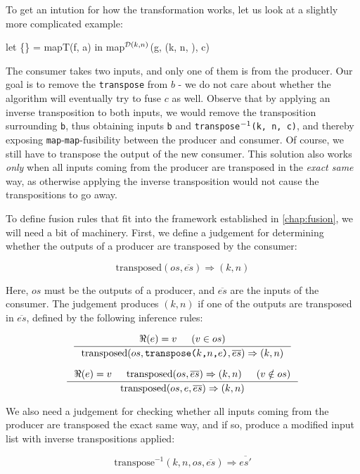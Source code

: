 To get an intution for how the transformation works, let us look at a
slightly more complicated example:

\begin{colorcode}
let \{\} = mapT(f, a) in
map\(^{\mathcal{D}(k,n)}\)(g, (k, n, ), c)
\end{colorcode}

The consumer takes two inputs, and only one of them is from the
producer.  Our goal is to remove the \texttt{transpose} from $b$ - we
do not care about whether the algorithm will eventually try to fuse
$c$ as well.  Observe that by applying an inverse transposition to
both inputs, we would remove the transposition surrounding \texttt{b},
thus obtaining inputs \texttt{b} and
\texttt{transpose\(^{-1}\)(k, n, c)}, and thereby exposing
\texttt{map}-\texttt{map}-fusibility between the producer and
consumer.  Of course, we still have to transpose the output of the new
consumer.  This solution also works \textit{only} when all inputs
coming from the producer are transposed in the \textit{exact same}
way, as otherwise applying the inverse transposition would not cause
the transpositions to go away.

To define fusion rules that fit into the framework established in
\cref{chap:fusion}, we will need a bit of machinery.  First, we define
a judgement for determining whether the outputs of a producer are
transposed by the consumer:

\[
\boxed{
  \text{transposed}(os,\overline{es}) \Rightarrow (k,n)
}
\]

Here, $os$ must be the outputs of a producer, and $\overline{es}$ are
the inputs of the consumer.  The judgement produces $(k,n)$ if one of
the outputs are transposed in $\overline{es}$, defined by the
following inference rules:

\[
\inference{
  \Re(e) = v
  &
  (v \in os)
}{
  \text{transposed}(os, \texttt{transpose($k$,$n$,$e$)}, \overline{es}) \Rightarrow (k,n)
}
\]

\[
\inference{
  \Re(e) = v
  &
  \text{transposed}(os,\overline{es}) \Rightarrow (k,n)
  &
  (v \notin os)
}{
  \text{transposed}(os, e, \overline{es}) \Rightarrow (k,n)
}
\]

We also need a judgement for checking whether all inputs coming from
the producer are transposed the exact same way, and if so, produce a
modified input list with inverse transpositions applied:

\[
\boxed{
  \text{transpose}^{-1}(k, n, os, \overline{es}) \Rightarrow \overline{es'}
}
\]

